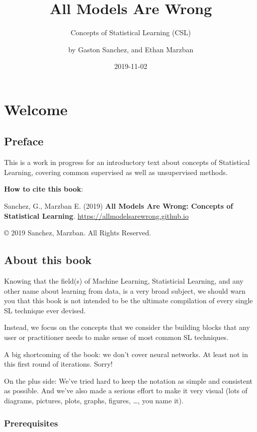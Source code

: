 \documentclass[]{book}
\title{All Models Are Wrong}
\subtitle{Concepts of Statistical Learning (CSL)}
\author{by Gaston Sanchez, and Ethan Marzban}
\date{2019-11-02}
\begin{document}
\maketitle

{
\setcounter{tocdepth}{1}
\tableofcontents
}
\hypertarget{part-welcome}{%
\part{Welcome}\label{part-welcome}}

\hypertarget{preface}{%
\chapter*{Preface}\label{preface}}

This is a work in progress for an introductory text about concepts of
Statistical Learning, covering common supervised as well as unsupervised methods.

\textbf{How to cite this book}:

Sanchez, G., Marzban E. (2019) \textbf{All Models Are Wrong: Concepts of Statistical Learning}.
\url{https://allmodelsarewrong.github.io}

© 2019 Sanchez, Marzban. All Rights Reserved.

\hypertarget{about}{%
\chapter{About this book}\label{about}}

Knowing that the field(s) of Machine Learning, Statisticial Learning, and any
other name about learning from data, is a very broad subject, we should warn you
that this book is not intended to be the ultimate compilation of every single
SL technique ever devised.

Instead, we focus on the concepts that we consider the building blocks that any
user or practitioner needs to make sense of most common SL techniques.

A big shortcoming of the book: we don't cover neural networks. At least not in this first round of iterations. Sorry!

On the plus side: We've tried hard to keep the notation as simple and consistent
as possible. And we've also made a serious effort to make it very visual
(lots of diagrams, pictures, plots, graphs, figures, \ldots, you name it).

\hypertarget{prerequisites}{%
\section{Prerequisites}\label{prerequisites}}
\end{document}
